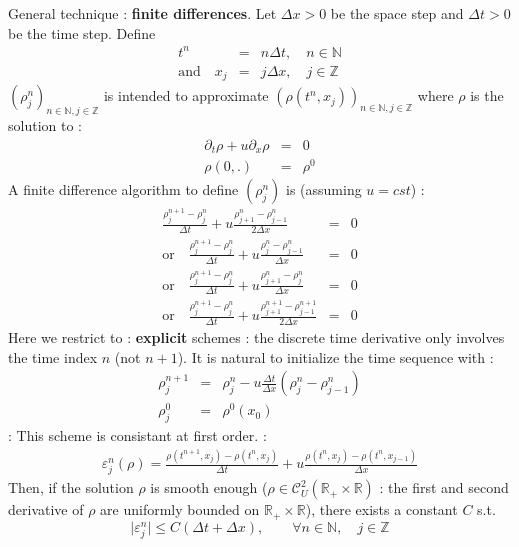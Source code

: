 \documentclass{report}
\newcommand{\R}{\ensuremath{\mathbb{R}}} %
\newcommand{\N}{\ensuremath{\mathbb{N}}} %
\newcommand*{\definition}[1]{\noindent\textbf{\color{cadmiumgreen}{#1}}}
\newcommand*{\theorem}[1]{\noindent\textbf{\color{purple}{#1}}}
\theoremstyle{plain}
\theoremstyle{definition}
\theoremstyle{remark}
\begin{document}
General technique : \textbf{finite differences}.
Let $\Delta x>0$ be the space step and $\Delta t>0$ be the time step.
Define 
\begin{eqnarray}
t^n &=& n\Delta t, \quad n \in \N \\
\text{and} \quad x_j &=& j \Delta x , \quad j \in \mathbb{Z} 
\end{eqnarray}
$(\rho^n_j)_{n \in \N, j \in \mathbb{Z}}$ is intended to approximate $\left(\rho(t^n,x_j)\right)_{n \in \N, j \in \mathbb{Z}}$ where $\rho$ is the solution to : 
\begin{eqnarray}
\partial_t \rho + u \partial_x \rho &=& 0 \\
\rho(0,.) &=& \rho^0
\end{eqnarray}
A finite difference algorithm to define $(\rho^n_j)$ is (assuming $u = cst$) :
\begin{eqnarray}
\frac{\rho^{n+1}_j - \rho^n_j}{\Delta t} + u \frac{\rho^{n}_{j+1} - \rho^n_{j-1}}{2\Delta x} &=& 0\\
\text{or} \quad \frac{\rho^{n+1}_j - \rho^n_j}{\Delta t} + u \frac{\rho^{n}_{j} - \rho^n_{j-1}}{\Delta x} &=& 0\\
\text{or} \quad \frac{\rho^{n+1}_j - \rho^n_j}{\Delta t} + u \frac{\rho^{n}_{j+1} - \rho^n_{j}}{\Delta x} &=& 0\\
\text{or} \quad \frac{\rho^{n+1}_j - \rho^n_j}{\Delta t} + u \frac{\rho^{n+1}_{j+1} - \rho^{n+1}_{j-1}}{2\Delta x} &=& 0
\end{eqnarray} 
Here we restrict to : \textbf{explicit} schemes : the discrete time derivative only involves the time index $n$ (not $n+1$).
It is natural to initialize the time sequence with : 
\begin{eqnarray}
\rho^{n+1}_j &=& \rho^n_j - u\frac{\Delta t}{\Delta x}\left(\rho^n_j - \rho^n_{j-1}\right) \\
\rho^0_j &=& \rho^0(x_0)
\end{eqnarray}
\theorem{Lemma} : This scheme is consistant at first order.
\definition{The consistency error} : 
\begin{eqnarray}
\varepsilon^n_j(\rho) = \frac{\rho(t^{n+1} ,x_{j}) - \rho(t^{n} ,x_{j})}{\Delta t} + u \frac{\rho(t^{n} ,x_{j}) - \rho(t^{n} ,x_{j-1})}{\Delta x}
\end{eqnarray}
Then, if the solution $\rho$ is smooth enough ($\rho \in \mathcal{C}^2_U (\R_{+} \times \R)$ : the first and second derivative of $\rho$ are uniformly bounded on $\R_{+} \times \R$), there exists a constant $C$ s.t. 
\begin{equation}
\vert \varepsilon^n_j \vert \le C(\Delta t + \Delta x),\qquad \forall n \in \N,\quad  j \in \mathbb{Z}
\end{equation}
\end{document}
